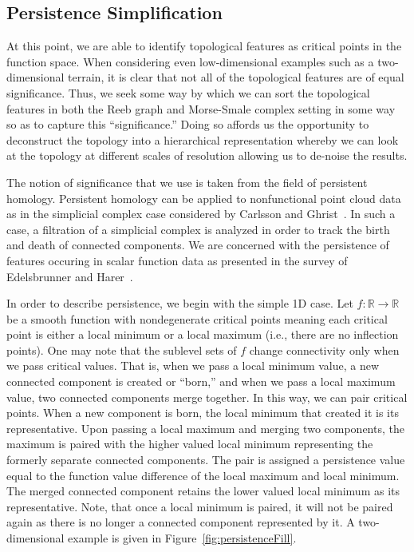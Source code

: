 \subsection{Persistence Simplification}
At this point, we are able to identify topological features as critical points in the function space.
%
When considering even low-dimensional examples such as a two-dimensional terrain, it is clear that not all of the topological features are of equal significance.
%
Thus, we seek some way by which we can sort the topological features in both the Reeb graph and  Morse-Smale complex setting in some way so as to capture this ``significance.''
%
Doing so affords us the opportunity to deconstruct the topology into a hierarchical representation whereby we can look at the topology at different scales of resolution allowing us to de-noise the results.

The notion of significance that we use is taken from the field of persistent homology.
%
Persistent homology can be applied to nonfunctional point cloud data as in the simplicial complex case considered by Carlsson and Ghrist~\cite{Carlsson2009,Ghrist2009}.
%
In such a case, a filtration of a simplicial complex is analyzed in order to track the birth and death of connected components.
%
We are concerned with the persistence of features occuring in scalar function data as presented in the survey of Edelsbrunner and Harer~\cite{EdelsbrunnerHarer2008}.

In order to describe persistence, we begin with the simple 1D case.
%
Let $f: \mathbb{R} \rightarrow \mathbb{R}$ be a smooth function with nondegenerate critical points meaning each critical point is either a local minimum or a local maximum (i.e., there are no inflection points).
%
One may note that the sublevel sets of $f$ change connectivity only when we pass critical values.
%
That is, when we pass a local minimum value, a new connected component is created or ``born,'' and when we pass a local maximum value, two connected components merge together.
%
In this way, we can pair critical points.
%
When a new component is born, the local minimum that created it is its representative.
%
Upon passing a local maximum and merging two components, the maximum is paired with the higher valued local minimum representing the formerly separate connected components.
%
The pair is assigned a persistence value equal to the function value difference of the local maximum and local minimum.
%
The merged connected component retains the lower valued local minimum as its representative.
%
Note, that once a local minimum is paired, it will not be paired again as there is no longer a connected component represented by it.
%
A two-dimensional example is given in Figure~\ref{fig:persistenceFill}.

